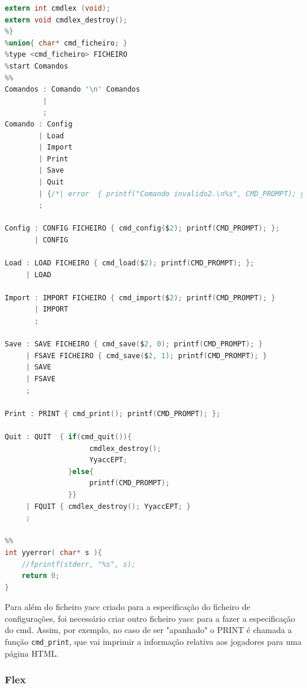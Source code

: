 \documentclass[11pt, a4paper, oneside]{article}
\begin{document}
\begin{lstlisting}[language=C, caption={Yacc do ficheiro cmd.}]
extern int cmdlex (void);
extern void cmdlex_destroy();
%}
%union{ char* cmd_ficheiro; }
%type <cmd_ficheiro> FICHEIRO
%start Comandos
%%
Comandos : Comando '\n' Comandos
         | 
         ;
Comando : Config
        | Load
        | Import
        | Print
        | Save
        | Quit
        | {/*| error  { printf("Comando invalido2.\n%s", CMD_PROMPT); yyclearin; yyerrok; }*/}
        ;

Config : CONFIG FICHEIRO { cmd_config($2); printf(CMD_PROMPT); };
       | CONFIG

Load : LOAD FICHEIRO { cmd_load($2); printf(CMD_PROMPT); };
     | LOAD

Import : IMPORT FICHEIRO { cmd_import($2); printf(CMD_PROMPT); }
       | IMPORT
       ;

Save : SAVE FICHEIRO { cmd_save($2, 0); printf(CMD_PROMPT); }
     | FSAVE FICHEIRO { cmd_save($2, 1); printf(CMD_PROMPT); }
     | SAVE
     | FSAVE
     ;

Print : PRINT { cmd_print(); printf(CMD_PROMPT); };

Quit : QUIT  { if(cmd_quit()){
                    cmdlex_destroy();
                    YyaccEPT;
               }else{
                    printf(CMD_PROMPT);
               }}
     | FQUIT { cmdlex_destroy(); YyaccEPT; }
     ;

%%
int yyerror( char* s ){
    //fprintf(stderr, "%s", s);
    return 0;
}
\end{lstlisting} 

Para além do ficheiro \textsf{yacc} criado para a especificação do ficheiro de configurações, foi necessário criar outro ficheiro \textsf{yacc} para a fazer a especificação do cmd. Assim, por exemplo, no caso de ser "apanhado" o \textsf{PRINT} é chamada a função \texttt{cmd\_print}, que vai imprimir a informação relativa aos jogadores para uma página \textsf{HTML}.

\subsubsection{\textsf{Flex}}
\end{document}
